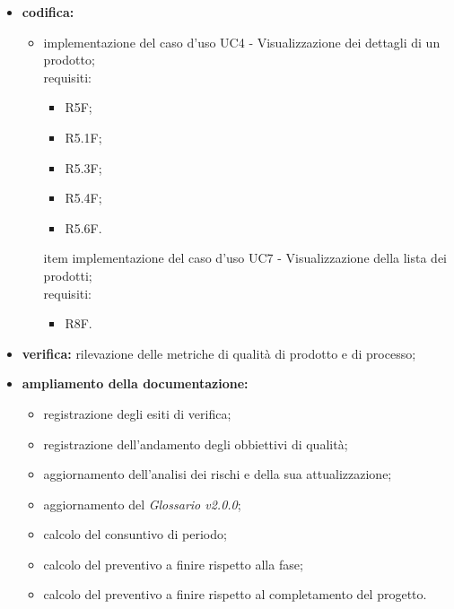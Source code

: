 \begin{itemize}
    \item \textbf{codifica:}
          \begin{itemize}
              \item implementazione del caso d'uso UC4 - Visualizzazione dei dettagli di un prodotto;\\ requisiti:
                    \begin{itemize}
                        \item R5F;
                        \item R5.1F;
                        \item R5.3F;
                        \item R5.4F;
                        \item R5.6F.
                    \end{itemize}
                    item implementazione del caso d'uso UC7 - Visualizzazione della lista dei prodotti;\\ requisiti:
                    \begin{itemize}
                        \item R8F.
                    \end{itemize}
          \end{itemize}
    \item \textbf{verifica:} rilevazione delle metriche di qualità di prodotto e di processo;
    \item \textbf{ampliamento della documentazione:}
          \begin{itemize}
              \item registrazione degli esiti di verifica;
              \item registrazione dell'andamento degli obbiettivi di qualità;
              \item aggiornamento dell'analisi dei rischi e della sua attualizzazione;
              \item aggiornamento del \textit{Glossario v2.0.0};
              \item calcolo del consuntivo di periodo;
              \item calcolo del preventivo a finire rispetto alla fase;
              \item calcolo del preventivo a finire rispetto al completamento del progetto.
          \end{itemize}
\end{itemize}

